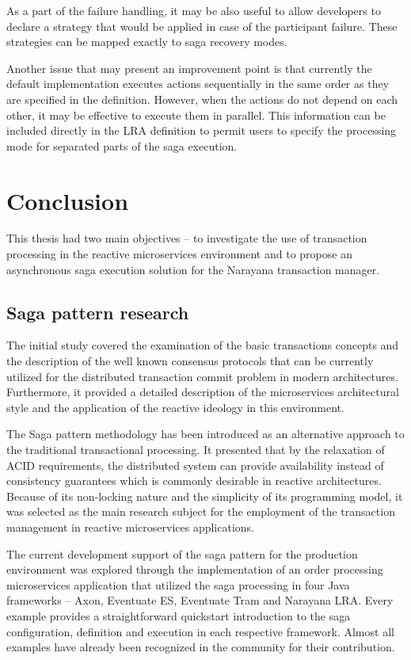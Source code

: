 \documentclass[oneside,
  digital, %
  table,   %
  lof,     %
  lot,     %
]{fithesis3}
\begin{document}
As a part of the failure handling, it may be also useful to allow developers to declare a strategy that would be applied in case of the participant failure. These strategies can be mapped exactly to saga recovery modes. 

Another issue that may present an improvement point is that currently the default implementation executes actions sequentially in the same order as they are specified in the definition. However, when the actions do not depend on each other, it may be effective to execute them in parallel. This information can be included directly in the LRA definition to permit users to specify the processing mode for separated parts of the saga execution.


\clearpage
\chapter{Conclusion}

This thesis had two main objectives -- to investigate the use of transaction processing in the reactive microservices environment and to propose an asynchronous saga execution solution for the Narayana transaction manager.

\section{Saga pattern research}

The initial study covered the examination of the basic transactions concepts and the description of the well known consensus protocols that can be currently utilized for the distributed transaction commit problem in modern architectures. Furthermore, it provided a detailed description of the microservices architectural style and the application of the reactive ideology in this environment.

The Saga pattern \cite{sagas_publ} methodology has been introduced as an alternative approach to the traditional transactional processing. It presented that by the relaxation of ACID requirements, the distributed system can provide availability instead of consistency guarantees which is commonly desirable in reactive architectures. Because of its non-locking nature and the simplicity of its programming model, it was selected as the main research subject for the employment of the transaction management in reactive microservices applications.

The current development support of the saga pattern for the production environment was explored through the implementation of an order processing microservices application that utilized the saga processing in four Java frameworks -- Axon, Eventuate ES, Eventuate Tram and Narayana LRA. Every example provides a straightforward quickstart introduction to the saga configuration, definition and execution in each respective framework. Almost all examples have already been recognized in the community for their contribution.
\end{document}

